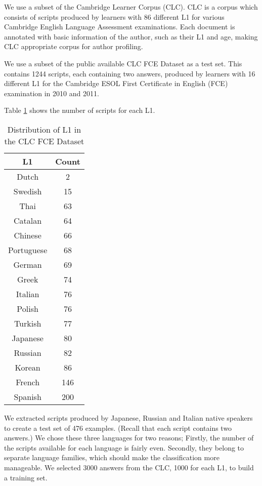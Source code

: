 We use a subset of the Cambridge Learner Corpus \citep{nicholls2003cambridge} (CLC).
CLC is a corpus which consists of scripts produced by learners with 86 different L1 for various Cambridge English Language Assessment examinations.
Each document is annotated with basic information of the author, such as their L1 and age, making CLC appropriate corpus for author profiling.

We use a subset of the public available CLC FCE Dataset \citep{yannakoudakis2011new} as a test set.
This contains 1244 scripts, each containing two answers, produced by learners with 16 different L1 for the Cambridge ESOL First Certificate in English (FCE) examination in 2010 and 2011.

Table \ref{tab:l1-fce} shows the number of scripts for each L1.
\begin{table}[]
\centering
\caption{Distribution of L1 in the CLC FCE Dataset}
\label{tab:l1-fce}
\begin{tabular}{|c|c|}
\hline
L1         & Count \\ \hline
Dutch      & 2     \\ \hline
Swedish    & 15    \\ \hline
Thai       & 63    \\ \hline
Catalan    & 64    \\ \hline
Chinese    & 66    \\ \hline
Portuguese & 68    \\ \hline
German     & 69    \\ \hline
Greek      & 74    \\ \hline
Italian    & 76    \\ \hline
Polish     & 76    \\ \hline
Turkish    & 77    \\ \hline
Japanese   & 80    \\ \hline
Russian    & 82    \\ \hline
Korean     & 86    \\ \hline
French     & 146   \\ \hline
Spanish    & 200   \\ \hline
\end{tabular}
\end{table}
We extracted scripts produced by Japanese, Russian and Italian native speakers to create a test set of 476 examples.
(Recall that each script contains two answers.)
We chose these three languages for two reasons;
Firstly, the number of the scripts available for each language is fairly even.
Secondly, they belong to separate language families, which should make the classification more manageable.
We selected 3000 answers from the CLC, 1000 for each L1, to build a training set.

